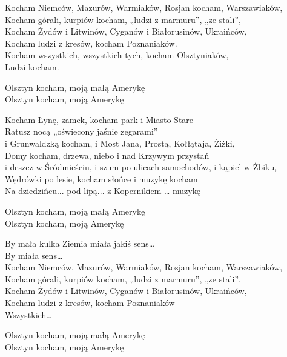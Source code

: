 \begin{text}
    Kocham Niemców, Mazurów, Warmiaków, Rosjan kocham, Warszawiaków,\\
    Kocham górali, kurpiów kocham, „ludzi z marmuru”, „ze stali”,\\
    Kocham Żydów i Litwinów, Cyganów i Białorusinów, Ukraińców,\\
    Kocham ludzi z kresów, kocham Poznaniaków.\\
    Kocham wszystkich, wszystkich tych, kocham Olsztyniaków,\\
    Ludzi kocham.

    Olsztyn kocham, moją małą Amerykę\\
    Olsztyn kocham, moją Amerykę

    Kocham Łynę, zamek, kocham park i Miasto Stare\\
    Ratusz nocą „oświecony jaśnie zegarami”\\
    i Grunwaldzką kocham, i Most Jana, Prostą, Kołłątaja, Żiżki,\\
    Domy kocham, drzewa, niebo i nad Krzywym przystań\\
    i deszcz w Śródmieściu, i szum po ulicach samochodów, i kąpiel w Żbiku,\\
    Wędrówki po lesie, kocham słońce i muzykę kocham\\
    Na dziedzińcu... pod lipą... z Kopernikiem … muzykę

    Olsztyn kocham, moją małą Amerykę\\
    Olsztyn kocham, moją Amerykę

    By mała kulka Ziemia miała jakiś sens…\\
    By miała sens…\\
    Kocham Niemców, Mazurów, Warmiaków, Rosjan kocham, Warszawiaków,\\
    Kocham górali, kurpiów kocham, „ludzi z marmuru”, „ze stali”,\\
    Kocham Żydów i Litwinów, Cyganów i Białorusinów, Ukraińców,\\
    Kocham ludzi z kresów, kocham Poznaniaków\\
    Wszystkich…

    Olsztyn kocham, moją małą Amerykę\\
    Olsztyn kocham, moją Amerykę
\end{text}
\begin{chord}

\end{chord}